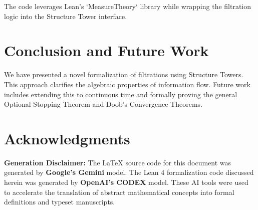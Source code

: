 \documentclass[11pt, a4paper]{article}
\theoremstyle{definition}
\theoremstyle{plain}
\begin{document}
The code leverages Lean's `MeasureTheory` library while wrapping the filtration logic into the Structure Tower interface.

\section{Conclusion and Future Work}

We have presented a novel formalization of filtrations using Structure Towers. This approach clarifies the algebraic properties of information flow. Future work includes extending this to continuous time and formally proving the general Optional Stopping Theorem and Doob's Convergence Theorems.

\section*{Acknowledgments}

\textbf{Generation Disclaimer:} 
The LaTeX source code for this document was generated by \textbf{Google's Gemini} model. 
The Lean 4 formalization code discussed herein was generated by \textbf{OpenAI's CODEX} model. 
These AI tools were used to accelerate the translation of abstract mathematical concepts into formal definitions and typeset manuscripts.
\end{document}
